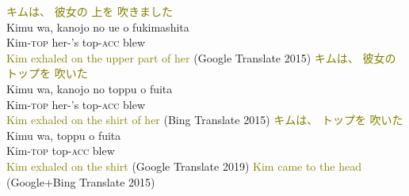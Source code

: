 \documentclass[a4paper,landscape,headrule,footrule,xetex]{foils}
\newcommand{\tra}[1]{\textcolor{olive}{\textsf{#1}}}
\begin{document}

\begin{exe}
  \ex {}
  \trans \glll \tra{キムは、} \tra{彼女の} \tra{上を} \tra{吹きました} \\
  {Kimu wa,} {kanojo no} {ue o} fukimashita \\
  Kim-\textsc{top} her-'s top-\textsc{acc} blew \\  
  \trans  \tra{Kim exhaled on the upper part of her} (Google Translate
  2015)
 \trans \glll \tra{キムは、} \tra{彼女の} \tra{トップを} \tra{吹いた} \\
  {Kimu wa,} {kanojo no} {toppu o} fuita \\
  Kim-\textsc{top} her-'s top-\textsc{acc} blew \\  
  \trans  \tra{Kim exhaled on the shirt of her} (Bing Translate 2015)
 \trans \glll \tra{キムは、} \tra{トップを} \tra{吹いた} \\
  {Kimu wa,} {toppu o} fuita \\
  Kim-\textsc{top}  top-\textsc{acc} blew \\  
  \trans  \tra{Kim exhaled on the shirt} (Google Translate 2019)
  \ex {}
  \trans \tra{Kim came to the head} (Google+Bing Translate 2015)
\end{exe}
\end{document}
